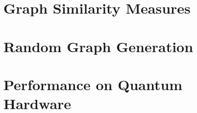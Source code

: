 \section{Graph Similarity Measures}

\section{Random Graph Generation}

\section{Performance on Quantum Hardware}
